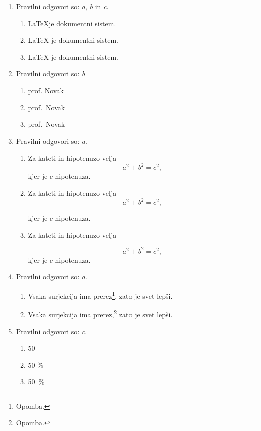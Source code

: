 \documentclass[11pt]{article}
\begin{document}
\begin{enumerate}
    \item Pravilni odgovori so: \emph{a}, \emph{b} in \emph{c}.
    \begin{enumerate}
        \item \LaTeX je dokumentni sistem.
        \item {\LaTeX} je dokumentni sistem.
        \item \LaTeX{} je dokumentni sistem.
    \end{enumerate}

    \item Pravilni odgovori so: \emph{b}
    \begin{enumerate}
        \item prof. Novak
        \item prof.~Novak
        \item prof.\ Novak
    \end{enumerate}

    \item Pravilni odgovori so: \emph{a}.
    \begin{enumerate}
        \item
Za kateti in hipotenuzo velja
\[
  a^2 + b^2 = c^2,
\]
kjer je \(c\) hipotenuza.
        \item
Za kateti in hipotenuzo velja
\[
  a^2 + b^2 = c^2,
\]

kjer je \(c\) hipotenuza.
        \item
Za kateti in hipotenuzo velja

\[
  a^2 + b^2 = c^2,
\]
kjer je \(c\) hipotenuza.
    \end{enumerate}

    \item Pravilni odgovori so: \emph{a}.
    \begin{enumerate}
        \item Vsaka surjekcija ima prerez\footnote{Opomba.}, zato je svet lepši.
        \item Vsaka surjekcija ima prerez,\footnote{Opomba.} zato je svet lepši.
    \end{enumerate}

    \item Pravilni odgovori so: \emph{c}.
    \begin{enumerate}
        \item 50 %
        \item 50 \%
        \item 50~\%
    \end{enumerate}


\end{enumerate}
\end{document}

